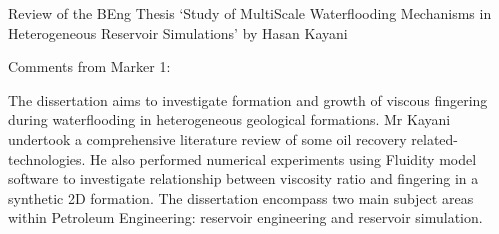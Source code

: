 \documentclass[14pt,twoside]{report}
\begin{document}
\vfill
\clearpage




\bigskip

\begin{center}
  {\Large Review of the BEng Thesis `Study of MultiScale Waterflooding Mechanisms in Heterogeneous Reservoir Simulations' by Hasan Kayani}
\end{center}

\noindent
{\Large Comments from Marker 1:}

The dissertation aims to investigate formation and growth of viscous fingering during waterflooding in heterogeneous geological formations. Mr Kayani undertook a comprehensive literature review of some oil recovery related-technologies. He also performed numerical experiments using Fluidity model software to investigate relationship between viscosity ratio and fingering in a synthetic 2D formation. The dissertation encompass two main subject areas within Petroleum Engineering: reservoir engineering and reservoir simulation.
\end{document}
